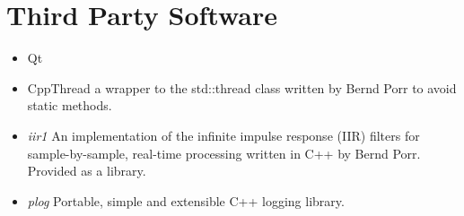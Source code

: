 \section{Third Party Software}

\begin{itemize}
\item Qt %
\item CppThread a wrapper to the std::thread class written by Bernd Porr to avoid static methods. %
\item \emph{iir1} An implementation of the infinite impulse response (IIR) filters for sample-by-sample, real-time processing written in C++ by Bernd Porr. Provided as a library.%
\item \emph{plog} Portable, simple and extensible C++ logging library. %
\end{itemize}
